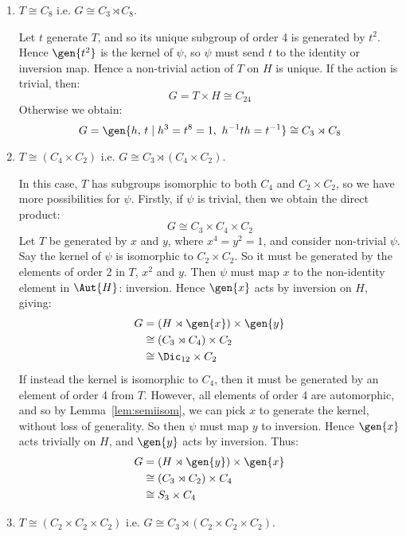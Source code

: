 \begin{enumerate}
    \item \(T \cong C_8\) i.e. \(G \cong C_3 \rtimes C_8\).

        Let \(t\) generate \(T\), and so its unique subgroup of order 4 is generated by \(t^2\).
        Hence \(\gen{t^2}\) is the kernel of \(\psi\), so \(\psi\) must send \(t\) to the identity or
        inversion map.
        Hence a non-trivial action of \(T\) on \(H\) is unique.
        If the action is trivial, then:
        \[G = T \times H \cong C_{24}\]
        Otherwise we obtain:
        \[G = \gen{h,\,t \mid h^3 = t^8 = 1,\ h^{-1}th = t^{-1}} \cong C_3 \rtimes C_8\]
    \item \(T \cong (C_4 \times C_2)\) i.e. \(G \cong C_3 \rtimes (C_4 \times C_2)\).

        In this case, \(T\) has subgroups isomorphic to both \(C_4\) and \(C_2 \times C_2\), so we have more
        possibilities for \(\psi\).
        Firstly, if \(\psi\) is trivial, then we obtain the direct product:
        \[G \cong C_3 \times C_4 \times C_2\]
        Let \(T\) be generated by \(x\) and \(y\), where \(x^4 = y^2 = 1\), and consider non-trivial \(\psi\).
        Say the kernel of \(\psi\) is isomorphic to \(C_2 \times C_2\).
        So it must be generated by the elements of order 2 in \(T\), \(x^2\) and \(y\).
        Then \(\psi\) must map \(x\) to the non-identity element in \(\Aut{H}\): inversion.
        Hence \(\gen{x}\) acts by inversion on \(H\), giving:
        \begin{equation*}
        \begin{aligned}
            G &= (H \rtimes \gen{x}) \times \gen{y} \\
            &\cong (C_3 \rtimes C_4) \times C_2 \\
            &\cong \Dic_{12} \times C_2
        \end{aligned}
        \end{equation*}
        If instead the kernel is isomorphic to \(C_4\), then it must be generated by an element of order 4 from \(T\).
        However, all elements of order 4 are automorphic, and so by Lemma~\ref{lem:semiisom}, we can pick \(x\) to
        generate the kernel, without loss of generality.
        So then \(\psi\) must map \(y\) to inversion.
        Hence \(\gen{x}\) acts trivially on \(H\), and \(\gen{y}\) acts by inversion.
        Thus:
        \begin{equation*}
        \begin{aligned}
            G &= (H \rtimes \gen{y}) \times \gen{x} \\
            &\cong (C_3 \rtimes C_2) \times C_4 \\
            &\cong S_3 \times C_4
        \end{aligned}
        \end{equation*}
    \item \(T \cong (C_2 \times C_2 \times C_2)\) i.e. \(G \cong C_3 \rtimes (C_2 \times C_2 \times C_2)\).


\end{enumerate}
